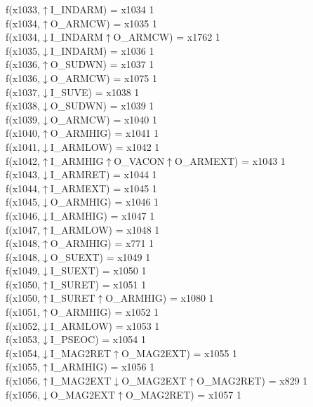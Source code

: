 f(x1033,$\uparrow$I\_INDARM) = x1034 {1} \\
f(x1034,$\uparrow$O\_ARMCW) = x1035 {1} \\
f(x1034,$\downarrow$I\_INDARM$\uparrow$O\_ARMCW) = x1762 {1} \\
f(x1035,$\downarrow$I\_INDARM) = x1036 {1} \\
f(x1036,$\uparrow$O\_SUDWN) = x1037 {1} \\
f(x1036,$\downarrow$O\_ARMCW) = x1075 {1} \\
f(x1037,$\downarrow$I\_SUVE) = x1038 {1} \\
f(x1038,$\downarrow$O\_SUDWN) = x1039 {1} \\
f(x1039,$\downarrow$O\_ARMCW) = x1040 {1} \\
f(x1040,$\uparrow$O\_ARMHIG) = x1041 {1} \\
f(x1041,$\downarrow$I\_ARMLOW) = x1042 {1} \\
f(x1042,$\uparrow$I\_ARMHIG$\uparrow$O\_VACON$\uparrow$O\_ARMEXT) = x1043 {1} \\
f(x1043,$\downarrow$I\_ARMRET) = x1044 {1} \\
f(x1044,$\uparrow$I\_ARMEXT) = x1045 {1} \\
f(x1045,$\downarrow$O\_ARMHIG) = x1046 {1} \\
f(x1046,$\downarrow$I\_ARMHIG) = x1047 {1} \\
f(x1047,$\uparrow$I\_ARMLOW) = x1048 {1} \\
f(x1048,$\uparrow$O\_ARMHIG) = x771 {1} \\
f(x1048,$\downarrow$O\_SUEXT) = x1049 {1} \\
f(x1049,$\downarrow$I\_SUEXT) = x1050 {1} \\
f(x1050,$\uparrow$I\_SURET) = x1051 {1} \\
f(x1050,$\uparrow$I\_SURET$\uparrow$O\_ARMHIG) = x1080 {1} \\
f(x1051,$\uparrow$O\_ARMHIG) = x1052 {1} \\
f(x1052,$\downarrow$I\_ARMLOW) = x1053 {1} \\
f(x1053,$\downarrow$I\_PSEOC) = x1054 {1} \\
f(x1054,$\downarrow$I\_MAG2RET$\uparrow$O\_MAG2EXT) = x1055 {1} \\
f(x1055,$\uparrow$I\_ARMHIG) = x1056 {1} \\
f(x1056,$\uparrow$I\_MAG2EXT$\downarrow$O\_MAG2EXT$\uparrow$O\_MAG2RET) = x829 {1} \\
f(x1056,$\downarrow$O\_MAG2EXT$\uparrow$O\_MAG2RET) = x1057 {1} \\
